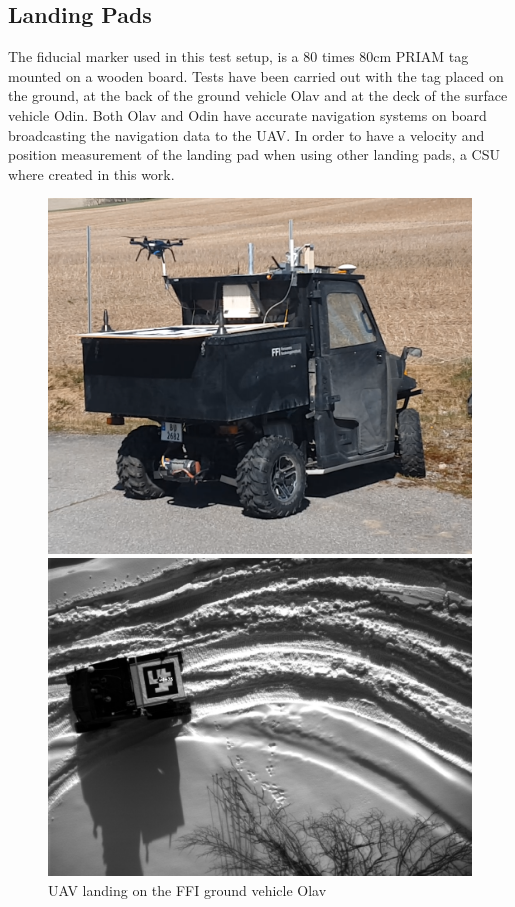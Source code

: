 
\subsection{Landing Pads} %
\label{sub:landing_pad}
The fiducial marker used in this test setup, is a 80 times 80cm \gls{PRIAM} tag mounted on a wooden board. Tests have been carried out with the tag placed on the ground, at the back of the ground vehicle Olav and at the deck of the surface vehicle Odin. Both Olav and Odin have accurate navigation systems on board broadcasting the navigation data to the \gls{UAV}. In order to have a velocity and position measurement of the landing pad when using other landing pads, a \gls{CSU} where created in this work.
\begin{figure}[ht]
\centering
  \begin{minipage}{.46\textwidth}
    \centering
    \includegraphics[width=\linewidth]{img/landingOnOlavStatic.png}
    \caption{UAV landing on the FFI ground vehicle Olav}
    \label{fig:olavAndTag} 
  \end{minipage}%
  \hfill
  \begin{minipage}{.52\textwidth}
    \centering
    \includegraphics[width=\linewidth]{img/aruco_track_12m.png}

\end{minipage}
\end{figure}
